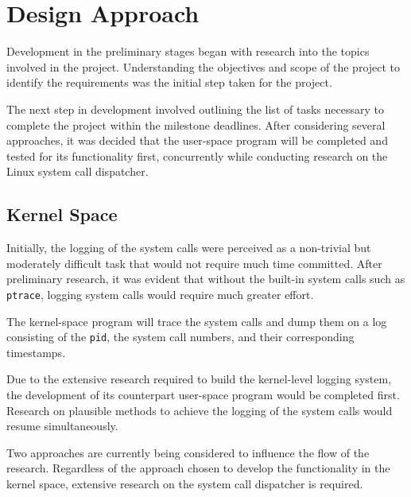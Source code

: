 \documentclass[paper=usletter, fontsize=12pt]{article}
\begin{document}

    

    \section{Design Approach} Development in the preliminary stages began with
    research into the topics involved in the project. Understanding the
    objectives and scope of the project to identify the requirements was the
    initial step taken for the project.

    The next step in development involved outlining the list of tasks necessary
    to complete the project within the milestone deadlines. After considering
    several approaches, it was decided that the user-space program will be
    completed and tested for its functionality first, concurrently while
    conducting research on the Linux system call dispatcher.

    \subsection{Kernel Space} Initially, the logging of the system calls were
    perceived as a non-trivial but moderately difficult task that would not
    require much time committed. After preliminary research, it was evident
    that without the built-in system calls such as \texttt{ptrace}, logging
    system calls would require much greater effort.

    The kernel-space program will trace the system calls and dump them on a log
    consisting of the \texttt{pid}, the system call numbers, and their
    corresponding timestamps.

    Due to the extensive research required to build the kernel-level logging
    system, the development of its counterpart user-space program would be
    completed first. Research on plausible methods to achieve the logging of
    the system calls would resume simultaneously.

    Two approaches are currently being considered to influence the flow of the
    research. Regardless of the approach chosen to develop the functionality in
    the kernel space, extensive research on the system call dispatcher is
    required.
\end{document}
